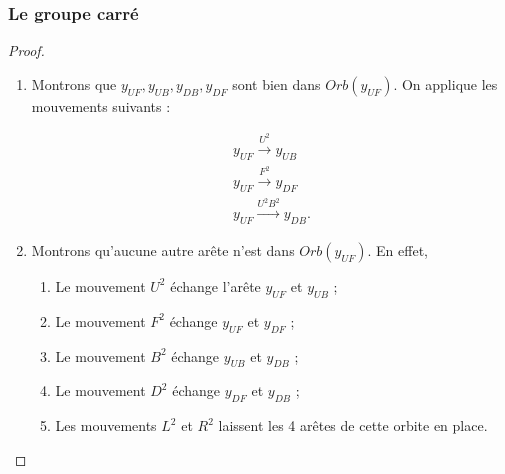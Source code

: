 \documentclass[10pt,notheorems]{beamer}
\theoremstyle{plain}
\theoremstyle{definition}
\theoremstyle{plain}
\theoremstyle{plain}
\theoremstyle{plain}
\theoremstyle{remark}
\begin{document}
\begin{frame}
  \frametitle{Le groupe carré}

  \begin{proof}
    \begin{enumerate}
      \item Montrons que $y _{UF}, y _{UB}, y _{DB}, y _{DF} $ sont bien dans $Orb(y _{UF})$. On applique les mouvements suivants :

      \begin{gather*}
        y _{UF}  \stackrel{U ^2}{\longrightarrow} y _{UB} \\
        y _{UF}  \stackrel{F ^2}{\longrightarrow} y _{DF} \\
        y _{UF}  \stackrel{U ^2 B ^2}{\longrightarrow} y _{DB}.
      \end{gather*}

      \item Montrons qu'aucune autre arête n'est dans $Orb( y _{UF})$. En effet,
      \begin{enumerate}
        \item Le mouvement $U ^2$ échange l'arête $y _{UF}$ et $y _{UB}$ ;
        \item Le mouvement $F ^2$ échange $y _{UF}$ et $y _{DF}$ ;
        \item Le mouvement $B ^2$ échange $ y _{UB}$ et $y _{DB}$ ;
        \item Le mouvement $D ^2$ échange $y _{DF}$ et $y _{DB}$ ;
        \item Les mouvements $L ^2$ et $R ^2$ laissent les 4 arêtes de cette orbite en place.
      \end{enumerate}

    \end{enumerate}
  \end{proof}
\end{frame}
\end{document}
